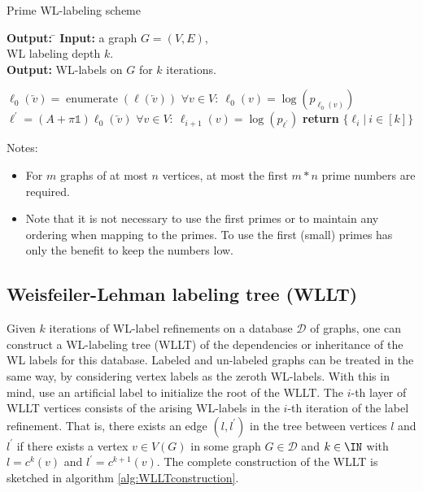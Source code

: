 \begin{algorithm}[H]
	\caption{Prime WL-labeling scheme} \label{alg:PrimeWLlabeling} 
	\begin{tabbing}
		\textbf{Output:} \= \kill
		\textbf{Input:} \>a graph $G=(V, E)$,\\
		\>WL labeling depth $k$.\\
		\textbf{Output:} \>WL-labels on $G$ for $k$ iterations.
	\end{tabbing}	
	\begin{algorithmic}[1]		
		\State $\ell_0(\overleftarrow{v})=\operatorname{enumerate}(\ell(\overleftarrow{v}))$ 
		\State $\forall v\in V: \ \ell_0(v) = \log(p_{\ell_{0}(v)})$ 
			\State $\ell^{\prime} = (A+\pi\mathbb{1}) \ell_{0}(\overleftarrow{v})$ 
			\State $\forall v\in V: \ \ell_{i+1}(v) = \log(p_{\ell^{\prime}})$ 
		\EndFor
		\State \textbf{return} $\{ \ell_{i}| \ i\in[k] \}$
	\end{algorithmic}
	Notes:
	\begin{itemize}
		\item For $m$ graphs of at most $n$ vertices, at most the first $m*n$ prime numbers are required.
		\item Note that it is not necessary to use the first primes or to maintain any ordering when mapping to the primes. To use the first (small) primes has only the benefit to keep the numbers low.
	\end{itemize}
\end{algorithm}



\subsection{Weisfeiler-Lehman labeling tree (WLLT)}

Given $k$ iterations of WL-label refinements on a database $\mathcal{D}$ of graphs, one can construct a WL-labeling tree (WLLT) of the dependencies or inheritance of the WL labels for this database.
Labeled and un-labeled graphs can be treated in the same way, by considering vertex labels as the zeroth WL-labels.
With this in mind, use an artificial label to initialize the root of the WLLT. 
The $i$-th layer of WLLT vertices consists of the arising WL-labels in the $i$-th iteration of the label refinement.
That is, there exists an edge $(l,l^\prime)$ in the tree between vertices $l$ and $l^\prime$ if there exists a vertex $v\in V(G)$ in some graph $G\in\mathcal{D}$ and $k\in\IN$ with $l=c^k(v)$ and $l^\prime=c^{k+1}(v)$.
The complete construction of the WLLT is sketched in algorithm \ref{alg:WLLTconstruction}.

